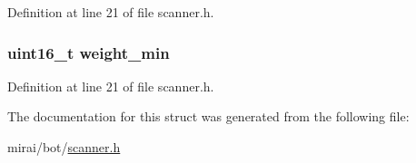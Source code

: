 Definition at line 21 of file scanner.\+h.

\subsubsection[{\texorpdfstring{weight\+\_\+min}{weight_min}}]{\setlength{\rightskip}{0pt plus 5cm}uint16\+\_\+t weight\+\_\+min}\hypertarget{structscanner__auth_a72d652522736ba740b7463fb533e135b}{}\label{structscanner__auth_a72d652522736ba740b7463fb533e135b}


Definition at line 21 of file scanner.\+h.



The documentation for this struct was generated from the following file\+:\begin{DoxyCompactItemize}
\item 
mirai/bot/\hyperlink{scanner_8h}{scanner.\+h}\end{DoxyCompactItemize}
